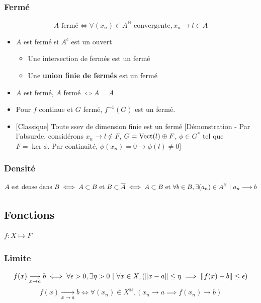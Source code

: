 \documentclass[openany]{book}
\begin{document}
\subsubsection{Fermé}

\[ A \text{ fermé} \iff \forall (x_n) \in A^{\mathbb{N}} \text{ convergente}, x_n \longrightarrow l \in A \]

\begin{itemize}
    \item $A$ est fermé si $A^c$ est un ouvert
    \begin{itemize}
        \item Une intersection de fermés est un fermé
        \item Une \textbf{union finie de fermés} est un fermé
    \end{itemize}
    \item $\overline{A}$ est fermé, $A$ fermé $\iff A = \overline{A}$
    \item Pour $f$ continue et $G$ fermé, $f^{-1}(G)$ est un fermé.
    \item{} [Classique] Toute ssev de dimension finie est un fermé [Démonstration - Par l'absurde, considérons $x_n \longrightarrow l \not \in F$, $G = \text{Vect} (l) \oplus F$, $\phi \in G^*$ tel que $F = \ker \phi$. Par continuité, $\phi(x_n) = 0 \longrightarrow \phi(l) \neq 0$]
\end{itemize}

\subsubsection{Densité}

\[ A \text{ est dense dans } B \iff A \subset B \text{ et } B \subset \overline{A} \iff A \subset B \text{ et } \forall b \in B, \exists (a_n)\in A^{\mathbb{N}} \text{ } | \text{ } a_n \longrightarrow b \]

\subsection{Fonctions}
$f : X \mapsto F$

\subsubsection{Limite}
\[ f(x) \underset{x \rightarrow a}{\longrightarrow} b \iff \forall \epsilon > 0, \exists \eta > 0 \text{ } | \text{ } \forall x \in X, (\|x-a\| \leq \eta \implies \|f(x) - b\| \leq \epsilon) \]
\[ f(x) \underset{x \rightarrow a}{\longrightarrow} b \iff \forall (x_n) \in X^{\mathbb{N}}, (x_n \longrightarrow a \implies f(x_n) \longrightarrow b) \]
\end{document}
